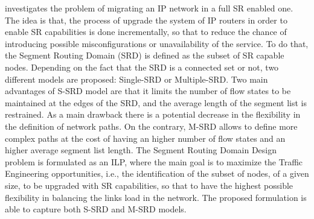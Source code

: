 \cite{incrementaldeploy} investigates the problem of migrating an IP network in a full SR enabled one.
The idea is that, the process of upgrade the system of IP routers in order to enable SR capabilities is done incrementally, so that to reduce the chance of introducing possible misconfigurations or unavailability of the service.
To do that, the Segment Routing Domain (SRD) is defined as the subset of SR capable nodes.
Depending on the fact that the SRD is a connected set or not, two different models are proposed: Single-SRD or Multiple-SRD.
Two main advantages of S-SRD model are that it limits the number of flow states to be maintained at the edges of the SRD, and the average length of the segment list is restrained.
As a main drawback there is a potential decrease in the flexibility in the definition of network paths.
On the contrary, M-SRD allows to define more complex paths at the cost of having an higher number of flow states and an higher average segment list length.
The Segment Routing Domain Design problem is formulated as an ILP, where the main goal is to maximize the Traffic Engineering opportunities, i.e., the identification of the subset of nodes, of a given size, to be upgraded with SR capabilities, so that to have the highest possible flexibility in balancing the links load in the network.
The proposed formulation is able to capture both S-SRD and M-SRD models.

